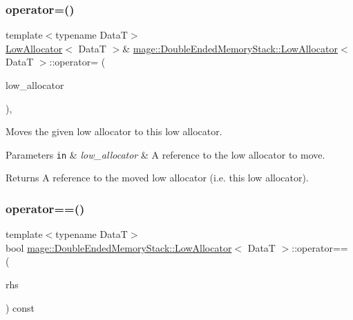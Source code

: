 \subsubsection{\texorpdfstring{operator=()}{operator=()}\hspace{0.1cm}{\footnotesize\ttfamily [2/2]}}
{\footnotesize\ttfamily template$<$typename DataT$>$ \\
\hyperlink{structmage_1_1_double_ended_memory_stack_1_1_low_allocator}{Low\+Allocator}$<$ DataT $>$\& \hyperlink{structmage_1_1_double_ended_memory_stack_1_1_low_allocator}{mage\+::\+Double\+Ended\+Memory\+Stack\+::\+Low\+Allocator}$<$ DataT $>$\+::operator= (\begin{DoxyParamCaption}\item[{\hyperlink{structmage_1_1_double_ended_memory_stack_1_1_low_allocator}{Low\+Allocator}$<$ DataT $>$ \&\&}]{low\+\_\+allocator }\end{DoxyParamCaption})\hspace{0.3cm}{\ttfamily [delete]}, {\ttfamily [noexcept]}}

Moves the given low allocator to this low allocator.


\begin{DoxyParams}[1]{Parameters}
\mbox{\tt in}  & {\em low\+\_\+allocator} & A reference to the low allocator to move. \\
\hline
\end{DoxyParams}
\begin{DoxyReturn}{Returns}
A reference to the moved low allocator (i.\+e. this low allocator). 
\end{DoxyReturn}
\hypertarget{structmage_1_1_double_ended_memory_stack_1_1_low_allocator_a0f2458c29c58b914e5595b8f614702f5}{}\label{structmage_1_1_double_ended_memory_stack_1_1_low_allocator_a0f2458c29c58b914e5595b8f614702f5} 
\subsubsection{\texorpdfstring{operator==()}{operator==()}}
{\footnotesize\ttfamily template$<$typename DataT$>$ \\
bool \hyperlink{structmage_1_1_double_ended_memory_stack_1_1_low_allocator}{mage\+::\+Double\+Ended\+Memory\+Stack\+::\+Low\+Allocator}$<$ DataT $>$\+::operator== (\begin{DoxyParamCaption}\item[{const \hyperlink{structmage_1_1_double_ended_memory_stack_1_1_low_allocator}{Low\+Allocator}$<$ DataT $>$ \&}]{rhs }\end{DoxyParamCaption}) const\hspace{0.3cm}{\ttfamily [noexcept]}}

